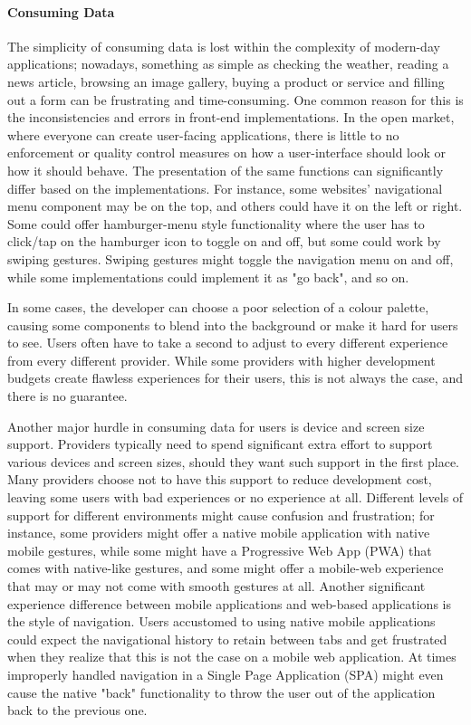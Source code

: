 \paragraph{Consuming Data}

The simplicity of consuming data is lost within the complexity of modern-day applications; nowadays, something as simple as checking the weather, reading a news article, browsing an image gallery, buying a product or service and filling out a form can be frustrating and time-consuming. One common reason for this is the inconsistencies and errors in front-end implementations. In the open market, where everyone can create user-facing applications, there is little to no enforcement or quality control measures on how a user-interface should look or how it should behave. The presentation of the same functions can significantly differ based on the implementations. For instance, some websites' navigational menu component may be on the top, and others could have it on the left or right. Some could offer hamburger-menu style functionality where the user has to click/tap on the hamburger icon to toggle on and off, but some could work by swiping gestures. Swiping gestures might toggle the navigation menu on and off, while some implementations could implement it as "go back", and so on. 

In some cases, the developer can choose a poor selection of a colour palette, causing some components to blend into the background or make it hard for users to see. Users often have to take a second to adjust to every different experience from every different provider. While some providers with higher development budgets create flawless experiences for their users, this is not always the case, and there is no guarantee.

Another major hurdle in consuming data for users is device and screen size support. Providers typically need to spend significant extra effort to support various devices and screen sizes, should they want such support in the first place. Many providers choose not to have this support to reduce development cost, leaving some users with bad experiences or no experience at all. Different levels of support for different environments might cause confusion and frustration; for instance, some providers might offer a native mobile application with native mobile gestures, while some might have a Progressive Web App (PWA) that comes with native-like gestures, and some might offer a mobile-web experience that may or may not come with smooth gestures at all. Another significant experience difference between mobile applications and web-based applications is the style of navigation. Users accustomed to using native mobile applications could expect the navigational history to retain between tabs and get frustrated when they realize that this is not the case on a mobile web application. At times improperly handled navigation in a Single Page Application (SPA) might even cause the native "back" functionality to throw the user out of the application back to the previous one.

